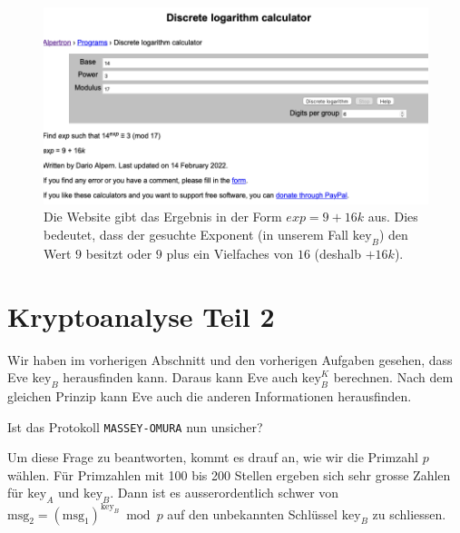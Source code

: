 %

\begin{figure}[htb]
	\includegraphics[scale=0.45]{dlp_solver_website_cut}
	\caption{Die Website gibt das Ergebnis in der Form $exp = 9 + 16k$ aus. Dies bedeutet, dass der gesuchte Exponent (in unserem Fall $\text{key}_B$) den Wert $9$ besitzt oder $9$ plus ein Vielfaches von $16$ (deshalb $+ 16k$).}
	\label{figure-dlp-solver-example}
\end{figure}

\newpage


\section{Kryptoanalyse Teil 2}

Wir haben im vorherigen Abschnitt und den vorherigen Aufgaben gesehen, dass Eve $\text{key}_B$ herausfinden kann. Daraus kann Eve auch $\text{key}_B^K$ berechnen. Nach dem gleichen Prinzip kann Eve auch die anderen Informationen herausfinden.

\begin{center}
	Ist das Protokoll \texttt{MASSEY-OMURA} nun unsicher?
\end{center}

Um diese Frage zu beantworten, kommt es drauf an, wie wir die Primzahl $p$ wählen. Für Primzahlen mit \num{100} bis \num{200} Stellen ergeben sich sehr grosse Zahlen für $\text{key}_A$ und $\text{key}_B$. Dann ist es ausserordentlich schwer von $\text{msg}_2 = (\text{msg}_1)^{\text{key}_B} \bmod p$ auf den unbekannten Schlüssel $\text{key}_B$ zu schliessen. 

